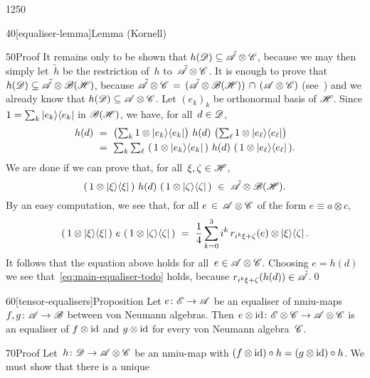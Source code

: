 \begin{parsec}{1250}
\begin{point}{40}[equaliser-lemma]{Lemma (Kornell)}
\begin{point}{50}{Proof}
It remains only to 
be shown that $h(\mathscr{D}) \subseteq \tilde{\mathscr{A}}\otimes \mathscr{C}$,
because we may then simply let~$\tilde{h}$
be the restriction of~$h$ to~$\tilde{\mathscr{A}}\otimes \mathscr{C}$.
It is enough to prove that
$h(\mathscr{D}) \subseteq \tilde{\mathscr{A}} 
\otimes  \mathscr{B}(\mathscr{H})$,
because 
$\tilde{\mathscr{A}} \otimes  \mathscr{C}
\,=\, (\tilde{\mathscr{A}}\otimes \mathscr{B}(\mathscr{H}))\,\cap\,
(\mathscr{A}\otimes \mathscr{C})$
(see~)
and we already know that $h(\mathscr{D})\subseteq \mathscr{A}\otimes \mathscr{C}$.
Let $(e_k)_k$ be orthonormal basis of $\mathscr{H}$.
Since $1= \sum_k \ket{e_k}\!\bra{e_k}$
in $\mathscr{B}(\mathscr{H})$,
we have, for all~$d\in\mathscr{D}$,
\begin{align*}
h(d) \ &=\ \textstyle\bigl(\sum_k 1\otimes \ket{e_k}\!\bra{e_k}\bigr)
\ h(d)\ \bigl(\sum_\ell 1\otimes \ket{e_\ell}\!\bra{e_\ell}\bigr)\\
\ &=\ \textstyle \sum_k\sum_\ell\ 
 (\,1\otimes \ket{e_k}\!\bra{e_k}\,) \ h(d)\  
 (\,1\otimes \ket{e_\ell}\!\bra{e_\ell}\,).
\end{align*}
We are done
if we can prove that,
for all~$\xi,\zeta\in\mathscr{H}$,
\begin{equation}
\label{eq:main-equaliser-todo}
(\,1\otimes \ket{\xi}\!\bra{\xi}\,) \ 
h(d)\  (\,1\otimes \ket{\zeta}\!\bra{\zeta}\,)
\ \in\ \tilde\scrA\otimes \bsp(\scrH).
\end{equation}
By an easy computation, we see that,
for all $e \,\in\,\mathscr{A}\otimes \mathscr{C}$
	of the form $e\equiv a\otimes c$,
\begin{equation*}
\label{eq:polarisation-equaliser}
(\,1\otimes \ket{\xi}\!\bra{\xi}\,) \ e
\  (\,1\otimes \ket{\zeta}\!\bra{\zeta}\,)
\ =\ 
\frac{1}{4}\sum_{k=0}^3i^k \,r_{i^k\xi+\zeta}(e)\otimes \ket\xi\!\bra\zeta.
\end{equation*}
It follows that the equation above holds for all~$e\in \mathscr{A}\otimes \mathscr{C}$.
Choosing $e=h(d)$
we see that~\eqref{eq:main-equaliser-todo}
holds,
because
$r_{i^k\xi+\zeta}(h(d)) \in\tilde{\mathscr{A}}$.\qed
\end{point}
\end{point}
\begin{point}{60}[tensor-equalisers]{Proposition}%
Let $e\colon\mathscr{E}\to\mathscr{A}$ be an equaliser of
nmiu-maps $f,g\colon\mathscr{A}\to\mathscr{B}$ 
between von Neumann algebras.
Then $e\otimes\mathrm{id}\colon\mathscr{E}\otimes\mathscr{C}\to\mathscr{A}\otimes\mathscr{C}$
is an equaliser of 
$f\otimes\mathrm{id}$ and $g\otimes\mathrm{id}$
for every von Neumann algebra~$\mathscr{C}$.
\begin{point}{70}{Proof}%
Let~$h\colon\mathscr{D}\to\mathscr{A}\otimes \mathscr{C}$
be an nmiu-map 
with $(f\otimes\mathrm{id})\circ h=(g\otimes\mathrm{id})\circ h$.
We must show that there is a unique

\end{point}
\end{point}
\end{parsec}

